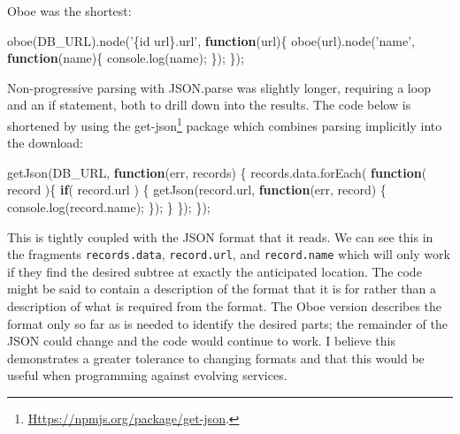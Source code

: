 \documentclass[]{article}
\newenvironment{Shaded}{}{}
\newcommand{\KeywordTok}[1]{\textcolor[rgb]{0.00,0.44,0.13}{\textbf{{#1}}}}
\newcommand{\StringTok}[1]{\textcolor[rgb]{0.25,0.44,0.63}{{#1}}}
\newcommand{\OtherTok}[1]{\textcolor[rgb]{0.00,0.44,0.13}{{#1}}}
\newcommand{\FunctionTok}[1]{\textcolor[rgb]{0.02,0.16,0.49}{{#1}}}
\newcommand{\NormalTok}[1]{{#1}}
\begin{document}
Oboe was the shortest:

\begin{Shaded}
\begin{Highlighting}[]
\FunctionTok{oboe}\NormalTok{(DB_URL).}\FunctionTok{node}\NormalTok{(}\StringTok{'\{id url\}.url'}\NormalTok{, }\KeywordTok{function}\NormalTok{(url)\{}
   \FunctionTok{oboe}\NormalTok{(url).}\FunctionTok{node}\NormalTok{(}\StringTok{'name'}\NormalTok{, }\KeywordTok{function}\NormalTok{(name)\{}
      \OtherTok{console}\NormalTok{.}\FunctionTok{log}\NormalTok{(name);               }
   \NormalTok{\});      }
\NormalTok{\});}
\end{Highlighting}
\end{Shaded}

Non-progressive parsing with JSON.parse was slightly longer, requiring a
loop and an if statement, both to drill down into the results. The code
below is shortened by using the get-json\footnote{\href{https://npmjs.org/package/get-json}{Https://npmjs.org/package/get-json}.}
package which combines parsing implicitly into the download:

\begin{Shaded}
\begin{Highlighting}[]
\FunctionTok{getJson}\NormalTok{(DB_URL, }\KeywordTok{function}\NormalTok{(err, records) \{}
   \OtherTok{records}\NormalTok{.}\OtherTok{data}\NormalTok{.}\FunctionTok{forEach}\NormalTok{( }\KeywordTok{function}\NormalTok{( record )\{}
      \KeywordTok{if}\NormalTok{( }\OtherTok{record}\NormalTok{.}\FunctionTok{url} \NormalTok{) \{}
         \FunctionTok{getJson}\NormalTok{(}\OtherTok{record}\NormalTok{.}\FunctionTok{url}\NormalTok{, }\KeywordTok{function}\NormalTok{(err, record) \{}
            \OtherTok{console}\NormalTok{.}\FunctionTok{log}\NormalTok{(}\OtherTok{record}\NormalTok{.}\FunctionTok{name}\NormalTok{);}
         \NormalTok{\});}
      \NormalTok{\}}
   \NormalTok{\});}
\NormalTok{\});}
\end{Highlighting}
\end{Shaded}

This is tightly coupled with the JSON format that it reads. We can see
this in the fragments \texttt{records.data}, \texttt{record.url}, and
\texttt{record.name} which will only work if they find the desired
subtree at exactly the anticipated location. The code might be said to
contain a description of the format that it is for rather than a
description of what is required from the format. The Oboe version
describes the format only so far as is needed to identify the desired
parts; the remainder of the JSON could change and the code would
continue to work. I believe this demonstrates a greater tolerance to
changing formats and that this would be useful when programming against
evolving services.
\end{document}
